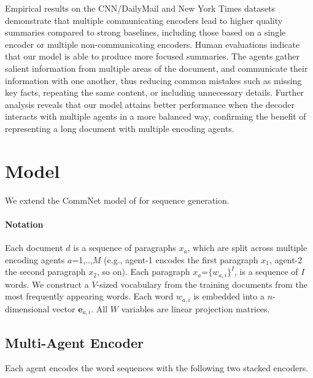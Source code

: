 \documentclass[11pt,a4paper]{article}
\newcommand{\yejin}[1]{{\color{cyan}yc:[#1]}}
\begin{document}
 
Empirical results on the CNN/DailyMail and New York Times datasets demonstrate that multiple communicating encoders lead to higher quality summaries compared to strong baselines, including those based on a single encoder or multiple non-communicating encoders. 
Human evaluations indicate that our model is able to produce more focused summaries. The agents gather salient information from multiple areas of the document, and communicate their information with one another, thus reducing common mistakes such as missing key facts, repeating the same content, or including unnecessary details. Further analysis reveals that our model attains better performance when the decoder interacts with multiple agents in a more balanced way, confirming the benefit of representing a long document with multiple encoding agents.  










 \section{Model}
\begin{comment}
\yejin{I think we should say something about commNet... (either to say that we follow their framework or present a modified version, if the architecture is similar enough...?)}
\end{comment}
We extend the CommNet model of \citet{commnet} for sequence generation. 
\paragraph{Notation}
Each document $d$ is a sequence of paragraphs $x_a$, which are split across multiple encoding agents $a$=1,..,$M$ (e.g., agent-1 encodes the first paragraph $x_1$, agent-2 the second paragraph $x_2$, so on). Each paragraph $x_{a}$=$\{w_{a,i}\}^I$, is a sequence of $I$ words. We construct a $V$-sized vocabulary from the training documents from the most frequently appearing words.
Each word $w_{a,i}$ is embedded into a $n$-dimensional vector $\mathbf{e}_{{a,i}}$. All $W$ variables are linear projection matrices.
\subsection{Multi-Agent Encoder}
\label{ucbir}
Each agent encodes the word sequences with the following two stacked encoders. 
\end{document}
